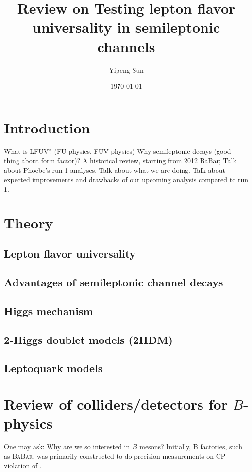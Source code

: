 \documentclass[10pt]{article}
\title{Review on Testing lepton flavor universality in semileptonic channels}
\author{Yipeng Sun}
\date{\today}
\def\BaBar/{\textsc{BaBar}}
\begin{document}
\maketitle

\section{Introduction}
What is LFUV? (FU physics, FUV physics)
Why semileptonic decays (good thing about form factor)?
A historical review, starting from 2012 BaBar;
Talk about Phoebe's run 1 analyses.
Talk about what we are doing.
Talk about expected improvements and drawbacks of our upcoming analysis compared
to run 1.

\section{Theory}
\subsection{Lepton flavor universality}

\subsection{Advantages of semileptonic channel decays}

\subsection{Higgs mechanism}

\subsection{2-Higgs doublet models (2HDM)}

\subsection{Leptoquark models}


\section{Review of colliders/detectors for $B$-physics}
One may ask: Why are we so interested in $B$ mesons?
Initially, B factories, such as \BaBar/, was primarily constructed to do
precision measurements on CP violation of \cite{Luth:1994}.
\end{document}
